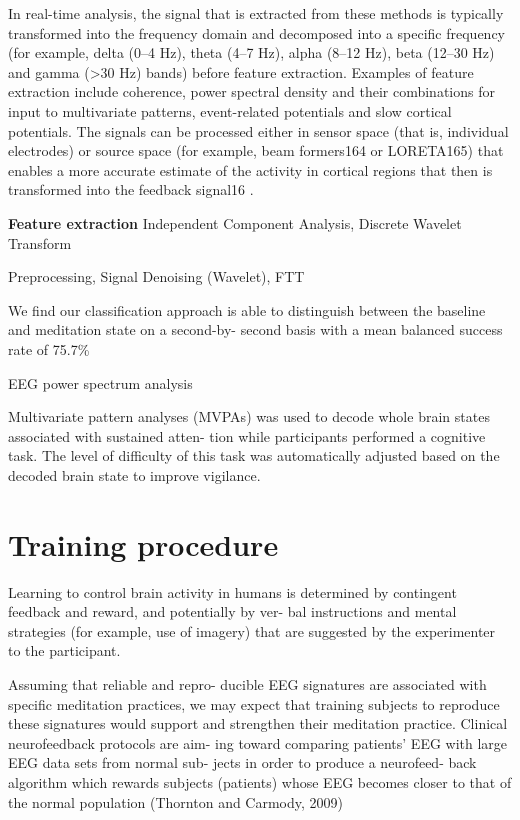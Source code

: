 \documentclass{llncs} %
\begin{document}
In real-time analysis, the signal that is extracted from these methods is typically transformed into the frequency domain and decomposed into a specific frequency (for example, delta (0–4 Hz), theta (4–7 Hz), alpha (8–12 Hz), beta (12–30 Hz) and gamma (>30 Hz) bands) before feature extraction. Examples of feature extraction include coherence, power spectral density and their combinations for input to multivariate patterns, event-related potentials and slow cortical potentials. The signals can be processed either in sensor space (that is, individual electrodes) or source space (for example, beam formers164 or LORETA165) that enables a more accurate estimate of the activity in cortical regions that then is transformed into the feedback signal16 \cite{Sitaram}.

\textbf{Feature extraction} Independent Component Analysis, Discrete Wavelet Transform 

Preprocessing, Signal Denoising (Wavelet), FTT

We find our classification approach is able to distinguish between the baseline and meditation state on a second-by- second basis with a mean balanced success rate of 75.7\% \cite{Dixit}

EEG power spectrum analysis



\cite{Lotte}

Multivariate pattern analyses (MVPAs) was used to decode whole brain states associated with sustained atten- tion while participants performed a cognitive task. The level of difficulty of this task was automatically adjusted based on the decoded brain state to improve vigilance. \cite{Sitaram}
\section{Training procedure}
Learning to control brain activity in humans is determined by contingent feedback and reward, and potentially by ver- bal instructions and mental strategies (for example, use of imagery) that are suggested by the experimenter to the participant. \cite{Sitaram}

Assuming that reliable and repro- ducible EEG signatures are associated with specific meditation practices, we may expect that training subjects to reproduce these signatures would support and strengthen their meditation practice.
Clinical neurofeedback protocols are aim- ing toward comparing patients’ EEG with large EEG data sets from normal sub- jects in order to produce a neurofeed- back algorithm which rewards subjects (patients) whose EEG becomes closer to that of the normal population (Thornton and Carmody, 2009) \cite{brand:del}
\end{document}
